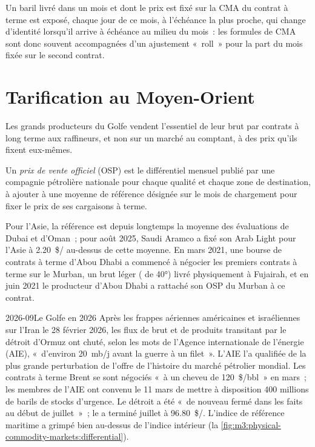 Un baril livré dans un mois et dont le prix est fixé sur la CMA du contrat à terme est exposé, chaque
jour de ce mois, à l'échéance la plus proche, qui change d'identité lorsqu'il
arrive à échéance au milieu du mois~: les formules de CMA sont donc souvent accompagnées
d'un ajustement «~roll~» pour la part du mois fixée sur le second contrat.

\section{Tarification au Moyen-Orient}

Les grands producteurs du Golfe vendent l'essentiel de leur brut par contrats à long terme aux raffineurs,
et non sur un marché au comptant, à des prix qu'ils fixent eux-mêmes.

\begin{definition}\label{def:m3:crude-oil:osp}
Un \emph{prix de vente officiel} (OSP) est le
différentiel mensuel publié par une compagnie pétrolière nationale pour chaque qualité et chaque
zone de destination, à ajouter à une moyenne de référence désignée sur le mois de chargement pour
fixer le prix de ses cargaisons à terme.
\end{definition}

Pour l'Asie, la référence est depuis longtemps la moyenne des évaluations de Dubai et d'Oman~;
pour août 2025, Saudi Aramco a fixé son Arab Light pour l'Asie à \qty{2.20}{\$/\barrel}
au-dessus de cette moyenne. En mars 2021, une bourse de contrats à terme d'Abou Dhabi a commencé
à négocier les premiers contrats à terme sur le Murban, un brut léger ( de 40°) livré physiquement à
Fujairah, et en juin 2021 le producteur d'Abou Dhabi a rattaché son OSP du Murban à ce
contrat.

\begin{dated}{2026-09}{Le Golfe en 2026}\label{dat:m3:crude-oil:hormuz}
Après les frappes aériennes américaines et israéliennes sur l'Iran le 28 février 2026, les flux de brut et
de produits transitant par le détroit d'Ormuz ont chuté, selon les mots de l'Agence internationale
de l'énergie (AIE), «~d'environ 20~mb/j avant la guerre à un filet~». L'AIE l'a qualifiée de la
plus grande perturbation de l'offre de l'histoire du marché pétrolier mondial. Les contrats à terme Brent
se sont négociés «~à un cheveu de 120~\$/bbl~» en mars~; les membres de l'AIE ont convenu le 11 mars de
mettre à disposition 400 millions de barils de stocks d'urgence. Le détroit a été
«~de nouveau fermé dans les faits au début de juillet~»~; le  a terminé juillet à
\qty{96.80}{\$/\barrel}. L'indice de référence maritime a grimpé bien au-dessus de l'indice intérieur
(la \cref{fig:m3:physical-commodity-markets:differential}).
\end{dated}

